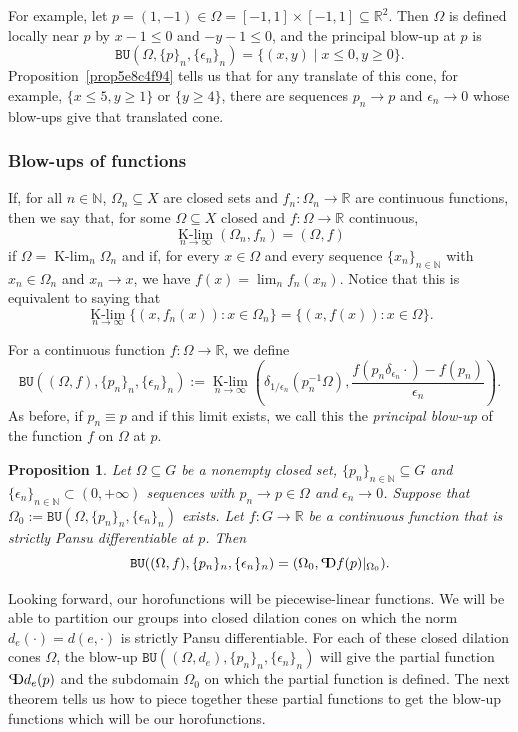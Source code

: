 \documentclass{article}
\newtheorem{prop}[theorem]{Proposition}
\theoremstyle{definition}
\newcommand{\BU}{\mathtt{BU}}
\newcommand{\Klim}{\operatorname*{K-lim}}
\newcommand{\inv}{^{-1}}
\newcommand{\pD}{\text{\scalebox{-1}[1]{$\mathrm{P}$}\!\!$\mathrm{D}$}}
\newcommand{\N}{{\mathbb N}}
\newcommand{\R}{{\mathbb R}}
\begin{document}
For example, let $p = (1,-1) \in \Omega = [-1,1]\times[-1,1] \subseteq \R^2$. Then $\Omega$ is defined locally near $p$ by $x -1 \leq 0$ and $-y - 1 \leq 0$, and the principal blow-up at $p$ is
\[\BU(\Omega,\{p\}_n,\{\epsilon_n\}_n) = \{(x,y) \mid x\leq 0, y \geq 0\}.\]
Proposition~\ref{prop5e8c4f94} tells us that for any translate of this cone, for example, $\{x\leq 5, y \geq 1\}$ or $\{y \geq 4\}$, there are sequences $p_n \to p$ and $\epsilon_n \to 0$ whose blow-ups give that translated cone.


\subsubsection{Blow-ups of functions}

If, for all $n\in\N$, $\Omega_n\subseteq X$ are closed sets and $f_n:\Omega_n\to\R$ are continuous functions, then we say that, for some $\Omega\subseteq X$ closed and $f:\Omega\to\R$ continuous,
\[
\Klim_{n\to\infty}(\Omega_n,f_n) = (\Omega,f)
\]
if $\Omega=\Klim_n\Omega_n$ and if, for every $x\in\Omega$ and every sequence $\{x_n\}_{n\in\N}$ with $x_n\in\Omega_n$ and $x_n\to x$, we have $f(x)=\lim_nf_n(x_n)$.
Notice that this is equivalent to saying that 
\[
\Klim_{n\to\infty} \{(x,f_n(x)):x\in\Omega_n\} = \{(x,f(x)):x\in\Omega\} .
\]


For a continuous function $f:\Omega\to\R$, we define
\[
\BU((\Omega,f),\{p_n\}_n,\{\epsilon_n\}_n) 
:= \Klim_{n\to \infty} \left( \delta_{1/\epsilon_n}(p_n\inv \Omega) , \frac{ f(p_n\delta_{\epsilon_n}\cdot)-f(p_n) }{ \epsilon_n } \right) .
\]
As before, if $p_n \equiv p$ and if this limit exists, we call this the {\em principal blow-up} of the function $f$ on $\Omega$ at $p$.

\begin{prop}\label{prop5e8c979c}{\cite[Proposition 3.8]{FNG}}
	Let $\Omega\subseteq G$ be a nonempty closed set, $\{p_n\}_{n\in\N}\subseteq G$ and $\{\epsilon_n\}_{n\in\N}\subset(0,+\infty)$ sequences with $p_n\to p\in\Omega$ and $\epsilon_n\to 0$.
	Suppose that $\Omega_0:=\BU(\Omega,\{p_n\}_n,\{\epsilon_n\}_n)$ exists.
	Let $f: G\to\R$ be a continuous function that is strictly Pansu differentiable at $p$.
	Then
	\[
	\BU((\Omega,f),\{p_n\}_n,\{\epsilon_n\}_n) 
	= ( \Omega_0 , \pD f(p)|_{\Omega_0} ) .
	\]
\end{prop}

Looking forward, our horofunctions will be piecewise-linear functions. We will be able to partition our groups into closed dilation cones on which the norm $d_e(\cdot) = d(e, \cdot)$ is strictly Pansu differentiable. For each of these closed dilation cones $\Omega$, the blow-up $\BU((\Omega,d_e),\{p_n\}_n,\{\epsilon_n\}_n)$ will give the partial function $\pD d_e(p)$ and the subdomain $\Omega_0$ on which the partial function is defined. The next theorem tells us how to piece together these partial functions to get the blow-up functions which will be our horofunctions.
\end{document}
